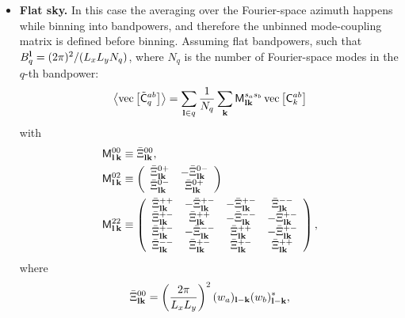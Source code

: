 \documentclass[a4paper,11pt]{article}
\begin{document}
\begin{itemize}
\begin{equation}
        \end{equation}
        \item {\bf Flat sky.} In this case the averaging over the Fourier-space azimuth happens while binning into bandpowers, and therefore the unbinned mode-coupling matrix is defined before binning. Assuming flat bandpowers, such that $B_q^{\bf l}=(2\pi)^2/(L_xL_yN_q)$, where $N_q$ is the number of Fourier-space modes in the $q$-th bandpower:
        \begin{equation}
          \left\langle{\rm vec}\left[\tilde{\sf C}^{ab}_q\right]\right\rangle=\sum_{{\bf l}\in q}\frac{1}{N_q} \sum_{\bf k}{\sf M}^{s_as_b}_{{\bf l}{\bf k}}\,{\rm vec}\left[{\sf C}^{ab}_k\right]
        \end{equation}
        with
        \begin{align}
          {\sf M}^{00}_{{\bf l}\,{\bf k}}&\equiv \bar{\Xi}^{00}_{{\bf l}{\bf k}},\\\label{eq:m02_flat}
          {\sf M}^{02}_{{\bf l}\,{\bf k}}&\equiv 
          \left(
          \begin{array}{cc}
            \bar{\Xi}^{0+}_{{\bf l}{\bf k}} & -\bar{\Xi}^{0-}_{{\bf l}{\bf k}} \\
            \bar{\Xi}^{0-}_{{\bf l}{\bf k}} &  \bar{\Xi}^{0+}_{{\bf l}{\bf k}}
          \end{array}\right)\\\label{eq:m22_flat}
          {\sf M}^{22}_{{\bf l}\,{\bf k}}&\equiv 
          \left(
          \begin{array}{cccc}
            \bar{\Xi}^{++}_{{\bf l}{\bf k}} & -\bar{\Xi}^{+-}_{{\bf l}{\bf k}} & -\bar{\Xi}^{+-}_{{\bf l}{\bf k}} &  \bar{\Xi}^{--}_{{\bf l}{\bf k}} \\
            \bar{\Xi}^{+-}_{{\bf l}{\bf k}} &  \bar{\Xi}^{++}_{{\bf l}{\bf k}} & -\bar{\Xi}^{--}_{{\bf l}{\bf k}} & -\bar{\Xi}^{+-}_{{\bf l}{\bf k}} \\
            \bar{\Xi}^{+-}_{{\bf l}{\bf k}} & -\bar{\Xi}^{--}_{{\bf l}{\bf k}} &  \bar{\Xi}^{++}_{{\bf l}{\bf k}} & -\bar{\Xi}^{+-}_{{\bf l}{\bf k}} \\
            \bar{\Xi}^{--}_{{\bf l}{\bf k}} &  \bar{\Xi}^{+-}_{{\bf l}{\bf k}} &  \bar{\Xi}^{+-}_{{\bf l}{\bf k}} & \bar{\Xi}^{++}_{{\bf l}{\bf k}}
          \end{array}\right),
        \end{align}
        where
        \begin{align}
          &\bar{\Xi}^{00}_{{\bf l}{\bf k}}=\left(\frac{2\pi}{L_xL_y}\right)^2 (w_a)_{{\bf l}-{\bf k}}(w_b)^*_{{\bf l}-{\bf k}},\\

\end{align}
\end{itemize}
\end{document}
